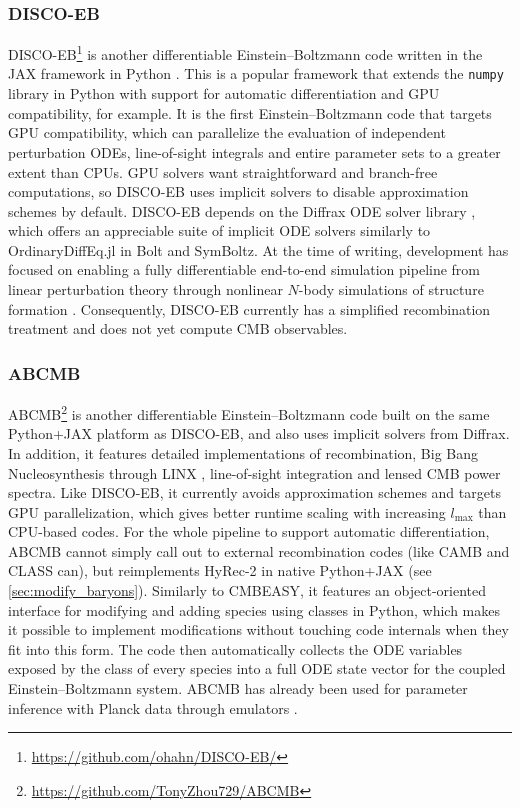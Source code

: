 \documentclass[USenglish, thumbmarks]{uiophdthesis} %
\newcommand\EB{Einstein--Boltzmann}
\newcommand\lmax{{\ensuremath{l_\mathrm{max}}}}
\begin{document}
\subsubsection{DISCO-EB}
DISCO-EB\footnote{\url{https://github.com/ohahn/DISCO-EB/}} \cite{hahnDISCODJDifferentiableEinsteinBoltzmann2024a}
is another differentiable \EB{} code written in the JAX framework in Python \cite{jax}.
This is a popular framework that extends the \texttt{numpy} library in Python with support for automatic differentiation and GPU compatibility, for example.
It is the first \EB{} code that targets GPU compatibility,
which can parallelize the evaluation of independent perturbation ODEs, line-of-sight integrals
and entire parameter sets to a greater extent than CPUs.
GPU solvers want straightforward and branch-free computations,
so DISCO-EB uses implicit solvers to disable approximation schemes by default.
DISCO-EB depends on the Diffrax ODE solver library \cite{kidgerNeuralDifferentialEquations2022},
which offers an appreciable suite of implicit ODE solvers similarly to OrdinaryDiffEq.jl in Bolt and SymBoltz.
At the time of writing, development has focused on enabling a fully differentiable end-to-end simulation pipeline from linear perturbation theory through nonlinear $N$-body simulations of structure formation \cite{hahnDISCODJDifferentiableEinsteinBoltzmann2024a,listDISCODJIIDifferentiable2026}.
Consequently, DISCO-EB currently has a simplified recombination treatment and does not yet compute CMB observables.

\subsubsection{ABCMB}
ABCMB\footnote{\url{https://github.com/TonyZhou729/ABCMB}} \cite{zhouABCMBPythonJAXPackage2026} is
another differentiable \EB{} code
built on the same Python+JAX platform as DISCO-EB, and also uses implicit solvers from Diffrax.
In addition, it features detailed implementations of recombination, Big Bang Nucleosynthesis through LINX \cite{giovanettiLINXFastDifferentiable2025},
line-of-sight integration and lensed CMB power spectra.
Like DISCO-EB, it currently avoids approximation schemes and targets GPU parallelization,
which gives better runtime scaling with increasing $\lmax$ than CPU-based codes.
For the whole pipeline to support automatic differentiation,
ABCMB cannot simply call out to external recombination codes (like CAMB and CLASS can),
but reimplements HyRec-2 in native Python+JAX (see \cref{sec:modify_baryons}).
Similarly to CMBEASY, it features an object-oriented interface for modifying and adding species using classes in Python,
which makes it possible to implement modifications without touching code internals when they fit into this form.
The code then automatically collects the ODE variables exposed by the class of every species
into a full ODE state vector for the coupled \EB{} system.
ABCMB has already been used for parameter inference with Planck data through emulators
\cite{giovanettiGenericTension2026,weinerBurstReionizationDark2026}.
\end{document}
